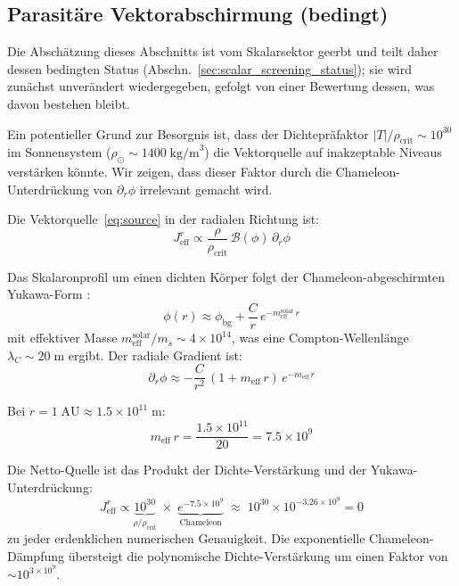 \documentclass[aps,prd,twocolumn,superscriptaddress,nofootinbib]{revtex4-2}
\begin{document}
\subsection{Parasit\"are Vektorabschirmung (bedingt)}
\label{sec:parasitic}

Die Absch\"atzung dieses Abschnitts ist vom Skalarsektor geerbt und teilt daher dessen bedingten Status (Abschn.~\ref{sec:scalar_screening_status}); sie wird zun\"achst unver\"andert wiedergegeben, gefolgt von einer Bewertung dessen, was davon bestehen bleibt.

Ein potentieller Grund zur Besorgnis ist, dass der Dichtepr\"afaktor $|T|/\rho_{\mathrm{crit}} \sim 10^{30}$ im Sonnensystem ($\rho_\odot \sim 1400\;\mathrm{kg/m}^3$) die Vektorquelle auf inakzeptable Niveaus verst\"arken k\"onnte. Wir zeigen, dass dieser Faktor durch die Chameleon-Unterdr\"uckung von $\partial_r\phi$ irrelevant gemacht wird.

Die Vektorquelle~\eqref{eq:source} in der radialen Richtung ist:
\begin{equation}
J^r_{\mathrm{eff}} \propto \frac{\rho}{\rho_{\mathrm{crit}}}\,\mathcal{B}(\phi)\,\partial_r\phi
\end{equation}

Das Skalaronprofil um einen dichten K\"orper folgt der Chameleon-abgeschirmten Yukawa-Form \cite{Geiger2026c}:
\begin{equation}
\phi(r) \approx \phi_{\mathrm{bg}} + \frac{C}{r}\,e^{-m_{\mathrm{eff}}^{\mathrm{solar}}\,r}
\end{equation}
mit effektiver Masse $m_{\mathrm{eff}}^{\mathrm{solar}}/m_s \sim 4 \times 10^{14}$, was eine Compton-Wellenl\"ange $\lambda_C \sim 20\;\mathrm{m}$ ergibt. Der radiale Gradient ist:
\begin{equation}
\partial_r\phi \approx -\frac{C}{r^2}\,(1 + m_{\mathrm{eff}}\,r)\,e^{-m_{\mathrm{eff}}\,r}
\end{equation}

Bei $r = 1\;\mathrm{AU} \approx 1.5 \times 10^{11}\;\mathrm{m}$:
\begin{equation}
m_{\mathrm{eff}}\,r = \frac{1.5 \times 10^{11}}{20} = 7.5 \times 10^9
\end{equation}

Die Netto-Quelle ist das Produkt der Dichte-Verst\"arkung und der Yukawa-Unterdr\"uckung:
\begin{equation}
J^r_{\mathrm{eff}} \propto \underbrace{10^{30}}_{\rho/\rho_{\mathrm{crit}}} \;\times\; \underbrace{e^{-7.5 \times 10^9}}_{\text{Chameleon}} \;\approx\; 10^{30} \times 10^{-3.26 \times 10^9} = 0
\label{eq:parasitic}
\end{equation}
zu jeder erdenklichen numerischen Genauigkeit. Die exponentielle Chameleon-D\"ampfung \"ubersteigt die polynomische Dichte-Verst\"arkung um einen Faktor von $\sim 10^{3 \times 10^9}$.
\end{document}
